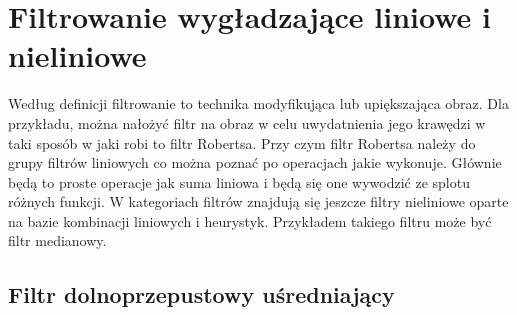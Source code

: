 \documentclass[a4paper,12pt]{book}
\begin{document}
\chapter{Filtrowanie wygładzające liniowe i nieliniowe}
	Według definicji filtrowanie to technika modyfikująca lub upiększająca obraz. Dla przykładu, można nałożyć filtr na obraz w celu uwydatnienia jego krawędzi w taki sposób w jaki robi to filtr Robertsa. Przy czym filtr Robertsa należy do grupy filtrów liniowych co można poznać po operacjach jakie wykonuje. Głównie będą to proste operacje jak suma liniowa i będą się one wywodzić ze splotu różnych funkcji. W kategoriach filtrów znajdują się jeszcze filtry nieliniowe oparte na bazie kombinacji liniowych i heurystyk. Przykładem takiego filtru może być filtr medianowy. 
	\section{Filtr dolnoprzepustowy uśredniający}
\end{document}
